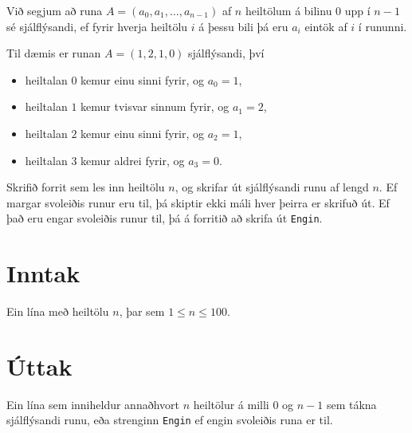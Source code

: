 
Við segjum að runa $A = (a_0, a_1, \ldots, a_{n-1})$ af $n$ heiltölum á
bilinu $0$ upp í $n-1$ sé sjálflýsandi, ef fyrir hverja heiltölu $i$ á þessu
bili þá eru $a_i$ eintök af $i$ í rununni.



Til dæmis er runan $A = (1,2,1,0)$ sjálflýsandi, því
\begin{itemize}
    \item heiltalan $0$ kemur einu sinni fyrir, og $a_0 = 1$,
    \item heiltalan $1$ kemur tvisvar sinnum fyrir, og $a_1 = 2$,
    \item heiltalan $2$ kemur einu sinni fyrir, og $a_2 = 1$,
    \item heiltalan $3$ kemur aldrei fyrir, og $a_3 = 0$.
\end{itemize}

Skrifið forrit sem les inn heiltölu $n$, og skrifar út sjálflýsandi runu af
lengd $n$. Ef margar svoleiðis runur eru til, þá skiptir ekki máli hver þeirra
er skrifuð út. Ef það eru engar svoleiðis runur til, þá á forritið að skrifa út
\texttt{Engin}.

\section*{Inntak}
Ein lína með heiltölu $n$, þar sem $1 \leq n \leq 100$.

\section*{Úttak}
Ein lína sem inniheldur annaðhvort $n$ heiltölur á milli $0$ og $n-1$ sem
tákna sjálflýsandi runu, eða strenginn \texttt{Engin} ef engin svoleiðis runa
er til.

